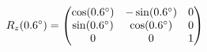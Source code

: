 \documentclass[preview]{standalone}
\begin{document}
\begin{align*}
\special{dvisvgm:raw <g id='unique000'>}R_z(0.6^\circ) = \begin{pmatrix} \cos(0.6^\circ) & -\sin(0.6^\circ) & 0 \\ \sin(0.6^\circ) & \cos(0.6^\circ) & 0 \\ 0 & 0 & 1 \end{pmatrix}\special{dvisvgm:raw </g>}
\end{align*}
\end{document}
